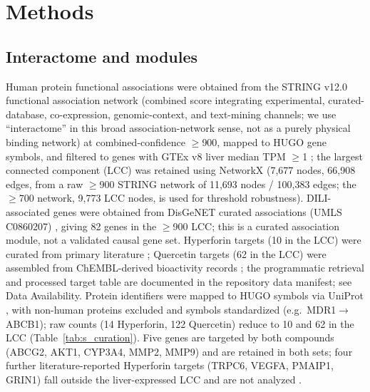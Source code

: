 \section{Methods}

\subsection{Interactome and modules}
Human protein functional associations were obtained from the STRING v12.0 functional association network \citep{Szklarczyk2023} (combined score integrating experimental, curated-database, co-expression, genomic-context, and text-mining channels; we use ``interactome'' in this broad association-network sense, not as a purely physical binding network) at combined-confidence $\geq$900, mapped to HUGO gene symbols, and filtered to genes with GTEx v8 liver median TPM $\geq$1 \citep{GTEx2020}; the largest connected component (LCC) was retained using NetworkX \citep{Hagberg2008} (7{,}677 nodes, 66{,}908 edges, from a raw $\geq$900 STRING network of 11{,}693 nodes / 100{,}383 edges; the $\geq$700 network, 9{,}773 LCC nodes, is used for threshold robustness). DILI-associated genes were obtained from DisGeNET curated associations (UMLS C0860207) \citep{Pinero2020}, giving 82 genes in the $\geq$900 LCC; this is a curated association module, not a validated causal gene set. Hyperforin targets (10 in the LCC) were curated from primary literature \citep{Moore2000, Watkins2001, Obach2000, Komoroski2004, Hennessy2002, Assefa2004, Wang2004, Quiney2007, Quiney2006}; Quercetin targets (62 in the LCC) were assembled from ChEMBL-derived bioactivity records \citep{Mendez2019}; the programmatic retrieval and processed target table are documented in the repository data manifest; see Data Availability. Protein identifiers were mapped to HUGO symbols via UniProt \citep{UniProt2023}, with non-human proteins excluded and symbols standardized (e.g.\ MDR1$\rightarrow$ABCB1); raw counts (14 Hyperforin, 122 Quercetin) reduce to 10 and 62 in the LCC (Table~\ref{tab:s_curation}). Five genes are targeted by both compounds (ABCG2, AKT1, CYP3A4, MMP2, MMP9) and are retained in both sets; four further literature-reported Hyperforin targets (TRPC6, VEGFA, PMAIP1, GRIN1) fall outside the liver-expressed LCC and are not analyzed \citep{Leuner2007, Hostanska2003, Kumar2006}.

